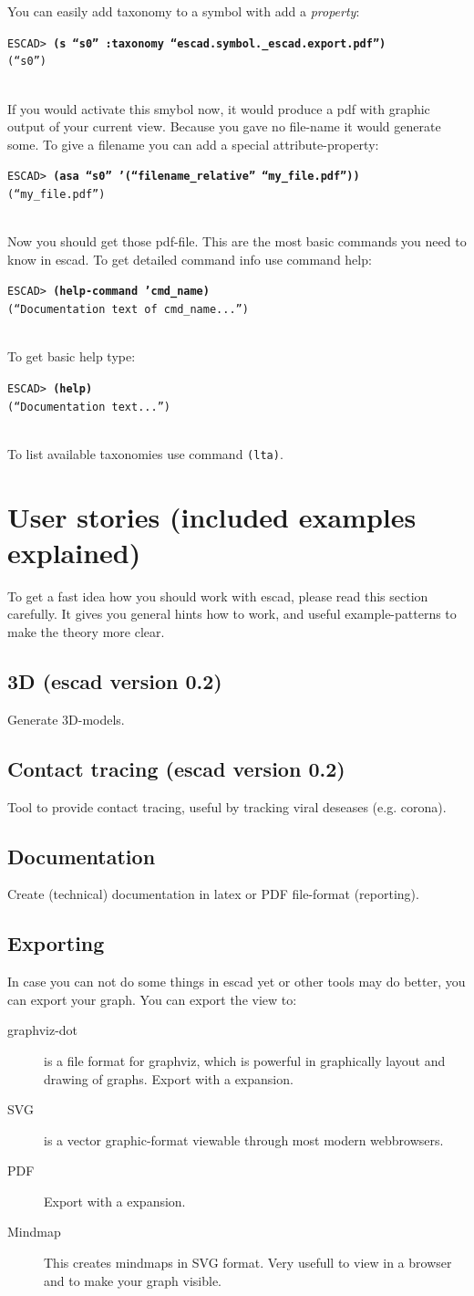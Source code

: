 \documentclass[a4paper, 12pt, openany]{scrbook}
\newcommand{\escadcmdline}[2]{\\\setlength{\fboxsep}{2pt}\colorbox{black!20}{\parbox{\textwidth}{\texttt{ESCAD> \textbf{#1}\\#2}}}\\}
\begin{document}
You can easily add taxonomy to a symbol with add a \emph{property}:
\escadcmdline{(s ``s0'' :taxonomy ``escad.symbol.\_escad.export.pdf'')}{(``s0'')}
If you would activate this smybol now, it would produce a pdf with graphic output of your current view. Because you gave no file-name it would generate some. To give a filename you can add a special attribute-property:
\escadcmdline{(asa ``s0'' '(``filename\_relative'' ``my\_file.pdf''))}{(``my\_file.pdf'')}
Now you should get those pdf-file.
This are the most basic commands you need to know in escad. To get detailed command info use command help:
\escadcmdline{(help-command 'cmd\_name)}{(``Documentation text of cmd\_name...'')}
To get basic help type:
\escadcmdline{(help)}{(``Documentation text...'')}
To list available taxonomies use command \texttt{(lta)}.
\section{User stories (included examples explained)}
To get a fast idea how you should work with escad, please read this section carefully. It gives you general hints how to work, and useful example-patterns to make the theory more clear.
\subsection{3D (escad version 0.2)}
Generate 3D-models.
\subsection{Contact tracing (escad version 0.2)}
Tool to provide contact tracing, useful by tracking viral deseases (e.g. corona).
\subsection{Documentation}
Create (technical) documentation in latex or PDF file-format (reporting).
\subsection{Exporting}
In case you can not do some things in escad yet or other tools may do better, you can export your graph. You can export the view to:
\begin{description}
\item[graphviz-dot] is a file format for graphviz, which is powerful in graphically layout and drawing of graphs. Export with a expansion.
\item[SVG] is a vector graphic-format viewable through most modern webbrowsers.
\item[PDF] Export with a expansion.
\item[Mindmap] This creates mindmaps in SVG format. Very usefull to view in a browser and to make your graph visible.
\end{description}
\end{document}
